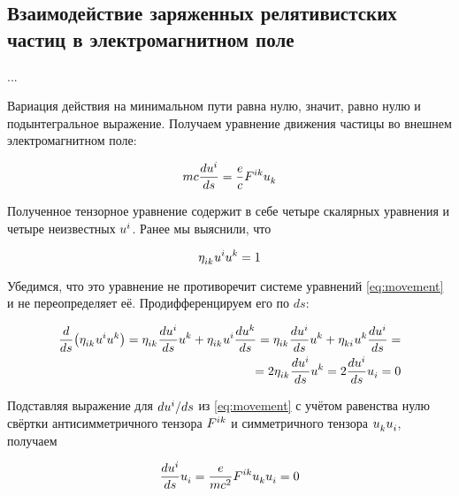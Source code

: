 \documentclass{article}
\begin{document}
\subsection{Взаимодействие заряженных релятивистских частиц в электромагнитном поле}

...

Вариация действия на минимальном пути равна нулю, значит, равно нулю и подынтегральное выражение. Получаем уравнение движения частицы во внешнем электромагнитном поле:

\begin{equation}\label{eq:movement}
    mc\frac{d\tensor{u}{^i}}{ds}=\frac{e}{c}\tensor{F}{^i^k}\tensor{u}{_k}
\end{equation}

Полученное тензорное уравнение содержит в себе четыре скалярных уравнения и четыре неизвестных $\tensor{u}{^i}$. Ранее мы выяснили, что 

\begin{equation}\label{eq:velnorm}
    \tensor{\eta}{_i_k}\tensor{u}{^i}\tensor{u}{^k}=1
\end{equation}

Убедимся, что это уравнение не противоречит системе уравнений \eqref{eq:movement} и не переопределяет её. Продифференцируем его по $ds$:

\begin{equation*}
    \begin{split}
        \frac{d}{ds}\big(\tensor{\eta}{_i_k}\tensor{u}{^i}\tensor{u}{^k}\big)=\tensor{\eta}{_i_k}\frac{d\tensor{u}{^i}}{ds}\tensor{u}{^k}+\tensor{\eta}{_i_k}\tensor{u}{^i}\frac{d\tensor{u}{^k}}{ds}=\tensor{\eta}{_i_k}\frac{d\tensor{u}{^i}}{ds}\tensor{u}{^k}+\tensor{\eta}{_k_i}\tensor{u}{^k}\frac{d\tensor{u}{^i}}{ds}=\\
        =2\tensor{\eta}{_i_k}\frac{d\tensor{u}{^i}}{ds}\tensor{u}{^k}=2\frac{d\tensor{u}{^i}}{ds}\tensor{u}{_i}=0
    \end{split}
\end{equation*}

Подставляя выражение для $d\tensor{u}{^i}/ds$ из \eqref{eq:movement} с учётом равенства нулю свёртки антисимметричного тензора $\tensor{F}{^i^k}$ и симметричного тензора $\tensor{u}{_k}\tensor{u}{_i}$, получаем

\begin{equation*}
    \frac{d\tensor{u}{^i}}{ds}\tensor{u}{_i}=\frac{e}{mc^2}\tensor{F}{^i^k}\tensor{u}{_k}\tensor{u}{_i}=0 
\end{equation*}
\end{document}
